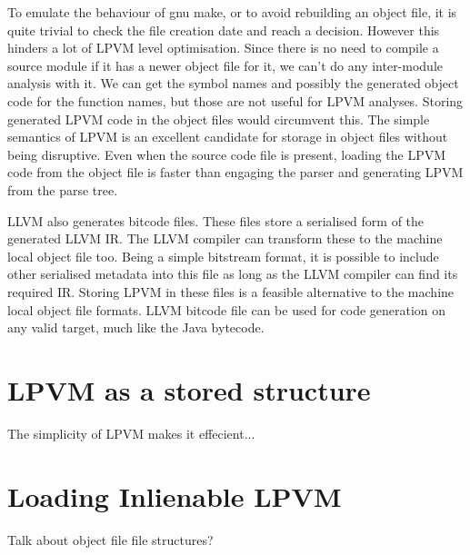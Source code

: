To emulate the behaviour of gnu make, or to avoid rebuilding an object file, it
is quite trivial to check the file creation date and reach a decision. However
this hinders a lot of LPVM level optimisation. Since there is no need to
compile a source module if it has a newer object file for it, we can't do any
inter-module analysis with it. We can get the symbol names and possibly the
generated object code for the function names, but those are not useful for LPVM
analyses. Storing generated LPVM code in the object files would circumvent
this. The simple semantics of LPVM is an excellent candidate for storage in
object files without being disruptive. Even when the source code file is
present, loading the LPVM code from the object file is faster than engaging the
parser and generating LPVM from the parse tree.

LLVM also generates bitcode files. These files store a serialised form of the
generated LLVM IR. The LLVM compiler can transform these to the machine local
object file too. Being a simple bitstream format, it is possible to include
other serialised metadata into this file as long as the LLVM compiler can find
its required IR. Storing LPVM in these files is a feasible alternative to the
machine local object file formats. LLVM bitcode file can be used for code
generation on any valid target, much like the Java bytecode. 

\section{LPVM as a stored structure}

The simplicity of LPVM makes it effecient...


\section{Loading Inlienable LPVM}

Talk about object file file structures?

